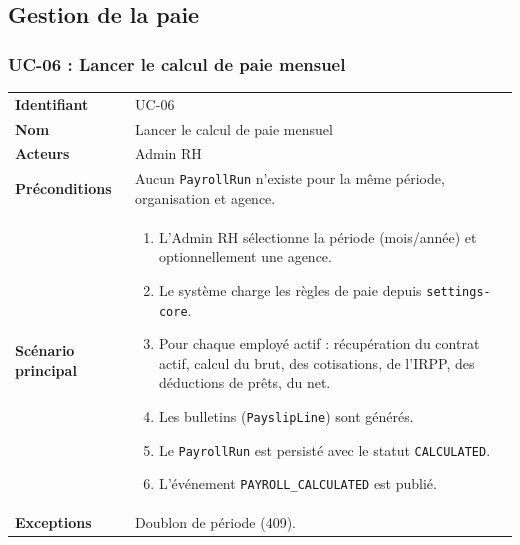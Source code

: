 \documentclass[a4paper,12pt,openany]{book}
\begin{document}

    \subsection{Gestion de la paie}

    \subsubsection*{UC-06 : Lancer le calcul de paie mensuel}
    \begin{table}[H]
        \centering
        \begin{tabularx}{\textwidth}{lX}
    \toprule
    \textbf{Identifiant} & UC-06 \\
    \textbf{Nom}         & Lancer le calcul de paie mensuel \\
    \textbf{Acteurs}     & Admin RH \\
    \textbf{Préconditions} & Aucun \texttt{PayrollRun} n'existe pour la même période, organisation et agence. \\
    \midrule
    \textbf{Scénario principal} &
    \begin{enumerate}[nosep]
      \item L'Admin RH sélectionne la période (mois/année) et optionnellement une agence.
      \item Le système charge les règles de paie depuis \texttt{settings-core}.
      \item Pour chaque employé actif : récupération du contrat actif, calcul du brut, des cotisations, de l'IRPP, des déductions de prêts, du net.
      \item Les bulletins (\texttt{PayslipLine}) sont générés.
      \item Le \texttt{PayrollRun} est persisté avec le statut \texttt{CALCULATED}.
      \item L'événement \texttt{PAYROLL\_CALCULATED} est publié.
    \end{enumerate} \\
    \textbf{Exceptions} & Doublon de période (409). \\
    \bottomrule
        \end{tabularx}
    \end{table}
\end{document}
